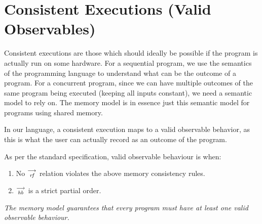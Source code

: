 

   \section{Consistent Executions (Valid Observables)}
      
      Consistent executions are those which should ideally be possible if the program is actually run on some hardware. 
      For a sequential program, we use the semantics of the programming language to understand what can be the outcome of a program. 
      For a concurrent program, since we can have multiple outcomes of the same program being executed (keeping all inputs constant), we need a semantic model to rely on. 
      The memory model is in essence just this semantic model for programs using shared memory.
      
      In our language, a consistent execution maps to a valid observable behavior, as this is what the user can actually record as an outcome of the program. 
   
      As per the standard specification, valid observable behaviour is when\footnotemark:
        \begin{enumerate}
           \item No $\stackrel{\longrightarrow}{_\textit{rf}}$ relation violates the above memory consistency rules.
           \item $\stackrel{\longrightarrow}{_\textit{hb}}$ is a strict partial order.
        \end{enumerate} 

        \textit{The memory model guarantees that every program must have at least one valid observable behaviour.}

    